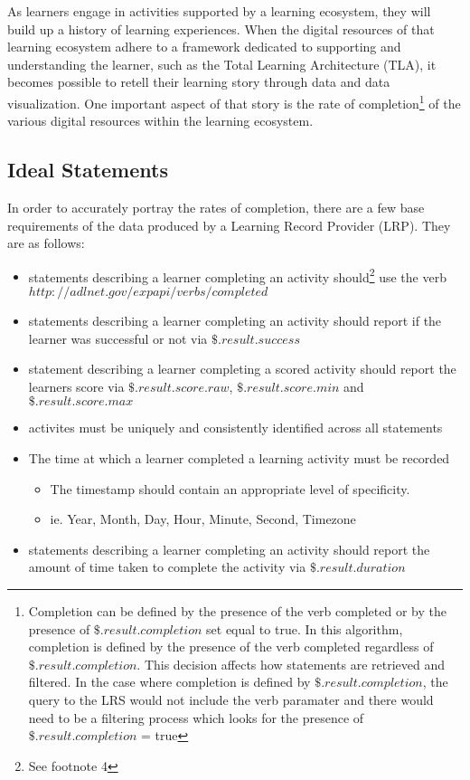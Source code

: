 \documentclass{article}
\begin{document}
As learners engage in activities supported by a learning ecosystem, they will build
up a history of learning experiences. When the digital resources of that learning ecosystem
adhere to a framework dedicated to supporting and understanding the
learner, such as the Total Learning Architecture (TLA), it becomes
possible to retell their learning story through data and data visualization. One important aspect of
that story is the rate of completion\footnote{\label{defOfCompletion}
  Completion can be defined by the presence of the verb completed or by the presence of
  $\$.result.completion$ set equal to true. In this algorithm,
  completion is defined by the presence of the verb completed
  regardless of $\$.result.completion$. This decision affects how
  statements are retrieved and filtered. In the case where completion
  is defined by $\$.result.completion$, the query to the LRS would not
  include the verb paramater and there would need to be a filtering
  process which looks for the presence of $\$.result.completion$ =
  true} of the various digital resources within the learning
ecosystem.
\subsection{Ideal Statements}

In order to accurately portray the rates of completion, there
are a few base requirements of the data produced by a Learning Record
Provider (LRP). They are as follows:
\begin{itemize}
\item statements describing a learner completing an activity
  should\footnote{\label{verbIRICompletion} See footnote 4}
  use the verb $http://adlnet.gov/expapi/verbs/completed$
\item statements describing a learner completing an activity should
  report if the learner was successful or not via
  $\$.result.success$
\item statement describing a learner completing a scored activity
  should report the learners score via $\$.result.score.raw$,
  $\$.result.score.min$ and $\$.result.score.max$
\item activites must be uniquely and consistently identified across
  all statements
\item The time at which a learner completed a learning activity must be recorded
  \begin{itemize}
  \item The timestamp should contain an appropriate level of specificity.
  \item ie. Year, Month, Day, Hour, Minute, Second, Timezone
  \end{itemize}
\item statements describing a learner completing an activity should
  report the amount of time taken to complete the activity via $\$.result.duration$
\end{itemize}
\end{document}
